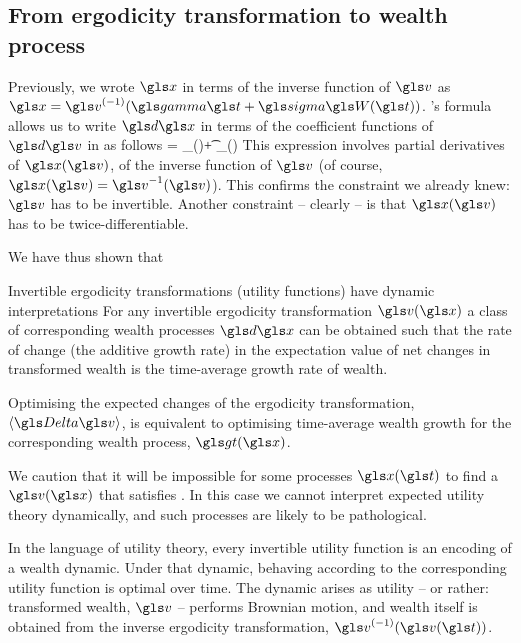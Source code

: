 \subsection{From ergodicity transformation to wealth process }
Previously, we wrote $\x$ in terms of the inverse function of $\gv$
as $\x=\gv^{(-1)}(\ggamma \t+\gsigma \gW(\t))$.
\Ito's formula allows us to write $\gd\x$ in terms of the coefficient functions 
of $\gd \gv$ in  as follows
\be
\gd\x = _{\ax(\x)}\gd\t + \underbrace{\bv \frac{\partial \x}{\partial \gv}}_{\bx(\x)} \gd\gW
{}
\ee
This expression involves partial derivatives of $\x(\gv)$, \ie of the inverse function of $\gv$ 
(of course, $\x(\gv)=\gv^{-1}(\gv)$). This confirms the constraint we already knew: $\gv$ 
has to be invertible. 
%
Another constraint -- clearly -- is that $\x(\gv)$ has to be twice-differentiable.

We have thus shown that 
\begin{keypts}{Invertible ergodicity transformations (utility functions) have dynamic interpretations}
For any invertible ergodicity transformation $\gv(\x)$ a class of corresponding
wealth processes $\gd\x$ can be obtained such that the rate of
change (\ie the additive growth rate) in the expectation value of net changes 
in transformed wealth is the time-average growth rate of wealth.
\end{keypts}
Optimising the expected changes of the ergodicity transformation, $\ave{\D\gv}$,
is equivalent to optimising time-average wealth growth for the
corresponding wealth process, $\gt(\x)$. 

We caution that it will be impossible for some processes $\x(\t)$ to find a $\gv(\x)$
that satisfies . 
In this case we cannot interpret expected utility theory dynamically,
and such processes are likely to be pathological. 


In the language of utility theory, every invertible utility 
function is an encoding of a wealth dynamic. Under that dynamic, behaving according to the
corresponding utility function is optimal over time. The dynamic arises as utility -- or rather: transformed wealth, $\gv$ -- performs
Brownian motion, and wealth itself is obtained from the inverse ergodicity transformation, $\gv^{(-1)}(\gv(\t))$. 

